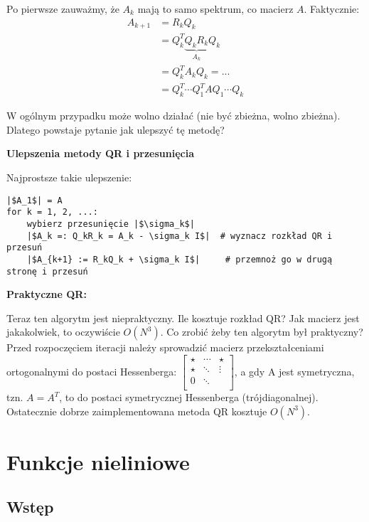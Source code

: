 \documentclass[hidelinks,a4paper,fleqn,oneside]{book}
\begin{document}
Po pierwsze zauważmy, że $A_k$ mają to samo spektrum, co macierz $A$. Faktycznie: 
\begin{equation}
	\begin{aligned}
		A_{k+1} & = R_kQ_k                            \\
		        & = Q_k^T\underbrace{Q_kR_k}_{A_k}Q_k \\
		        & = Q_k^TA_kQ_k = ...                 \\
		        & = Q_k^T\cdots Q_1^TA Q_1 \cdots Q_k 
	\end{aligned}
\end{equation}

W ogólnym przypadku może wolno działać (nie być zbieżna, wolno zbieżna). Dlatego powstaje pytanie jak ulepszyć tę metodę? 

\textbf{Ulepszenia metody QR i przesunięcia}

Najprostsze takie ulepszenie:
\begin{verbatim}
|$A_1$| = A
for k = 1, 2, ...:
    wybierz przesunięcie |$\sigma_k$|
    |$A_k =: Q_kR_k = A_k - \sigma_k I$|  # wyznacz rozkład QR i przesuń
    |$A_{k+1} := R_kQ_k + \sigma_k I$|     # przemnoż go w drugą stronę i przesuń
\end{verbatim}

\textbf{Praktyczne QR:}

Teraz ten algorytm jest niepraktyczny. Ile kosztuje rozkład QR? Jak macierz jest jakakolwiek, to oczywiście $O(N^3)$. Co zrobić żeby ten algorytm był praktyczny? Przed rozpoczęciem iteracji należy sprowadzić macierz przekształceniami ortogonalnymi do postaci Hessenberga: $\left[ \begin{array}{cccc} \star & \cdots & \star \\ \star & \ddots & \vdots \\ 0 & \ddots \\  \end{array} \right]$, a gdy A jest symetryczna, tzn. $A=A^T$, to do postaci symetrycznej Hessenberga (trójdiagonalnej). Ostatecznie dobrze zaimplementowana metoda QR kosztuje $O(N^3)$.

\chapter{Funkcje nieliniowe}

\section{Wstęp}
\end{document}
